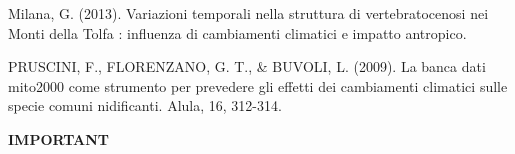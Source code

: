 \documentclass[12pt]{article}
\begin{document}
\begin{thebibliography}{999} %
Milana, G. (2013). Variazioni temporali nella struttura di vertebratocenosi nei Monti della Tolfa
: influenza di cambiamenti climatici e impatto antropico. 

PRUSCINI, F., FLORENZANO, G. T., & BUVOLI, L. (2009). La banca dati mito2000 come strumento per
prevedere gli effetti dei cambiamenti climatici sulle specie comuni nidificanti. Alula, 16, 312-314.
\end{thebibliography}

\newpage

\hline %
\bigskip %
\textbf{IMPORTANT} %
\bigskip %
\hline %
\end{document}
